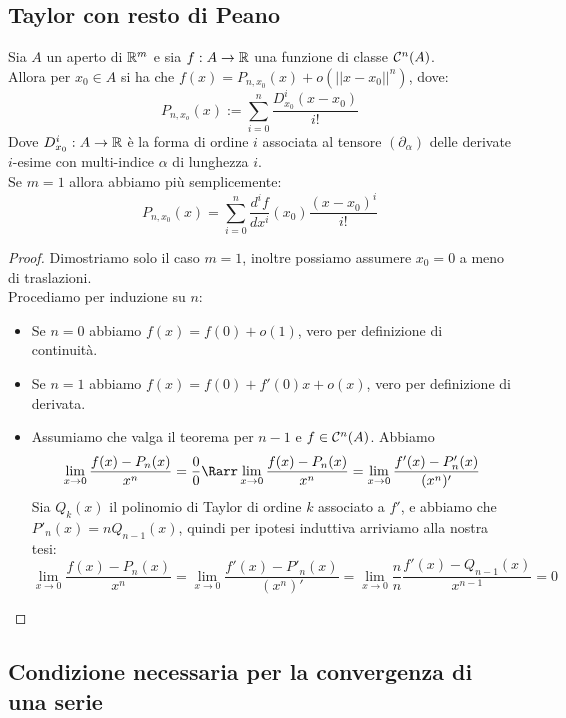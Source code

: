 \documentclass{article}
\begin{document}
\subsection{Taylor con resto di Peano}
\begin{theorem}{}{}
    Sia $A$ un aperto di $\mathbb{R}^m$ e sia  $f: A \to \mathbb{R}$ una funzione di classe $\mathcal{C}^n(A)$.\\
    Allora per $x_0 \in A$ si ha che $f(x) = P_{n,x_0}(x) + o(||x-x_0||^n)$, dove:
    \[P_{n,x_o}(x) := \sum_{i=0}^{n} \frac{D^i_{x_0}(x-x_0)}{i!}\]
    Dove $D^i_{x_0} : A\to\mathbb{R}$ è la forma di ordine $i$ associata al tensore $(\partial_\alpha)$ delle derivate $i$-esime con multi-indice $\alpha$ di lunghezza $i$.\\
    Se $m=1$ allora abbiamo più semplicemente:
    \[P_{n,x_0}(x) = \sum_{i=0}^{n}\frac{d^if}{dx^i} (x_0) \frac{(x-x_0)^i}{i!}\]
\end{theorem}
\begin{proof}
    Dimostriamo solo il caso $m=1$, inoltre possiamo assumere $x_0=0$ a meno di traslazioni.\\
    Procediamo per induzione su $n$:\begin{itemize}
        \item Se $n=0$ abbiamo $f(x)=f(0) + o(1)$, vero per definizione di continuità.
        \item Se $n=1$ abbiamo $f(x) = f(0) + f'(0)x + o(x)$, vero per definizione di derivata.
        \item Assumiamo che valga il teorema per $n-1$ e $f \in \mathcal{C}^n(A)$. Abbiamo
        \[\lim_{x\to 0}\frac{f(x)- P_{n}(x)}{x^n} = \frac{0}{0} \Rarr \lim_{x\to 0}\frac{f(x)- P_{n}(x)}{x^n} = \lim_{x\to 0}\frac{f'(x)- P'_{n}(x)}{(x^n)'}\]
        Sia $Q_k(x)$ il polinomio di Taylor di ordine $k$ associato a $f'$, e abbiamo che $P'_n(x) = nQ_{n-1}(x)$, quindi per ipotesi induttiva arriviamo alla nostra tesi:
        \[\lim_{x\to 0}\frac{f(x)- P_{n}(x)}{x^n} = \lim_{x\to 0}\frac{f'(x)- P'_{n}(x)}{(x^n)'} = \lim_{x\to 0} \frac{n}{n}\frac{f'(x)-Q_{n-1}(x)}{x^{n-1}} = 0\]
    \end{itemize}
\end{proof}

\subsection{Condizione necessaria per la convergenza di una serie}
\end{document}
